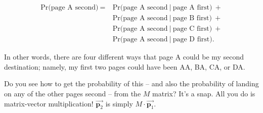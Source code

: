 \begin{alttitles}
\vspace{-.15in}
\begin{align*}
\textrm{Pr(page A second)}\ =\ &\textrm{Pr(page A second}\ |\ \textrm{page A
first)}\ + \\
                             &\textrm{Pr(page A second}\ |\ \textrm{page B
first)}\ + \\
                             &\textrm{Pr(page A second}\ |\ \textrm{page C
first)}\ + \\
                             &\textrm{Pr(page A second}\ |\ \textrm{page D first)}.
\end{align*}
\vspace{-.15in}

In other words, there are four different ways that page A could be my second
destination; namely, my first two pages could have been AA, BA, CA, or DA.

Do you see how to get the probability of this -- and also the probability of
landing on any of the other pages second -- from the $M$ matrix? It's a snap.
All you do is matrix-vector multiplication! $\overrightarrow{\textbf{p}_2}$ is
simply $M \cdot \overrightarrow{\textbf{p}_1}$.


\end{alttitles}
